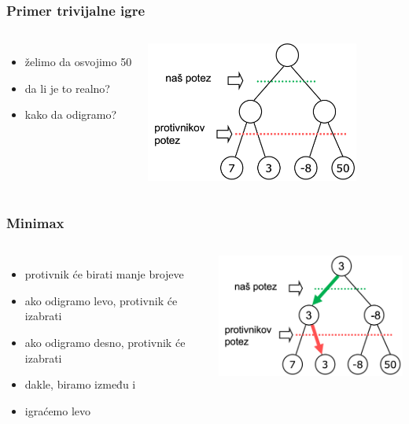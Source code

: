 \documentclass[compress,aspectratio=169]{beamer}
\begin{document}
\begin{frame}[fragile]
  \frametitle{Primer trivijalne igre}
  \begin{columns}
    \column{8cm}
    \begin{itemize}
      \item želimo da osvojimo 50
      \item da li je to realno?
      \item kako da odigramo?
    \end{itemize}
    \column{8cm}
    \begin{center}
      \includegraphics[width=7cm]{prj-01-pic07.png}
    \end{center}
\end{columns}
\end{frame}

\begin{frame}[fragile]
  \frametitle{Minimax}
  \begin{columns}
    \column{8cm}
    \begin{itemize}
      \item protivnik će birati manje brojeve
      \item ako odigramo levo, protivnik će izabrati \textbf{}
      \item ako odigramo desno, protivnik će izabrati \textbf{}
      \item dakle, biramo između \textbf{} i \textbf{}
      \item igraćemo levo
    \end{itemize}
    \column{8cm}
    \begin{center}
      \includegraphics[width=7cm]{prj-01-pic08.png}
    \end{center}
  \end{columns}
\end{frame}
\end{document}
